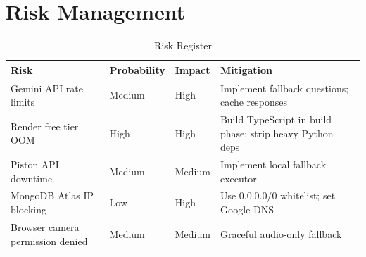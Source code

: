 \section{Risk Management}

\begin{table}[H]
\centering
\caption{Risk Register}
\vspace{6pt}
\begin{tabularx}{\textwidth}{|X|C{1.8cm}|C{1.5cm}|X|}
\hline
\textbf{Risk} & \textbf{Probability} & \textbf{Impact} & \textbf{Mitigation} \\
\hline
Gemini API rate limits & Medium & High & Implement fallback questions; cache responses \\
\hline
Render free tier OOM & High & High & Build TypeScript in build phase; strip heavy Python deps \\
\hline
Piston API downtime & Medium & Medium & Implement local fallback executor \\
\hline
MongoDB Atlas IP blocking & Low & High & Use 0.0.0.0/0 whitelist; set Google DNS \\
\hline
Browser camera permission denied & Medium & Medium & Graceful audio-only fallback \\
\hline
\end{tabularx}
\label{tab:risks}
\end{table}
